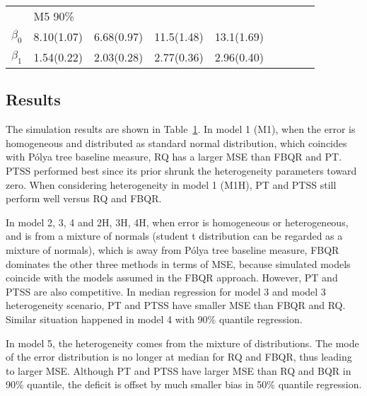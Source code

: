 \documentclass[12pt]{article}
\newcommand{\polya}{P\'{o}lya}
\begin{document}
\begin{center}
\begin{table}[h]
\begin{tabular}[tb]{c|llll|llll}
                & M5 90\%    &            &            &            &            &            &            &            \\
      $\beta_0$ & 8.10(1.07) & 6.68(0.97) & 11.5(1.48) & 13.1(1.69) &            &            &            &            \\
      $\beta_1$ & 1.54(0.22) & 2.03(0.28) & 2.77(0.36) & 2.96(0.40) &            &            &            &            \\
\hline
    \end{tabular}
    \label{ch2:tab:m1}
  \end{table}
\end{center}

\subsection{Results}
The simulation results are shown in Table~\ref{ch2:tab:m1}.  In model 1
(M1), when the error is homogeneous and distributed as standard normal
distribution, which coincides with \polya{} tree baseline measure, RQ
has a larger MSE than FBQR and PT. PTSS performed best since its prior
shrunk the heterogeneity parameters toward zero.  When considering
heterogeneity in model 1 (M1H), PT and PTSS still perform well versus
RQ and FBQR.

In model 2, 3, 4 and 2H, 3H, 4H, when error is homogeneous or
heterogeneous, and is from a mixture of normals (student t
distribution can be regarded as a mixture of normals), which is away
from \polya{} tree baseline measure, FBQR dominates the other three
methods in terms of MSE, because simulated models coincide with the
models assumed in the FBQR approach. However, PT and PTSS are also
competitive.  In median regression for model 3 and model 3
heterogeneity scenario, PT and PTSS have smaller MSE than FBQR and RQ.
Similar situation happened in model 4 with 90\% quantile
regression.

In model 5, the heterogeneity comes from the mixture of distributions.
The mode of the error distribution is no longer at median for RQ and
FBQR, thus leading to larger MSE. Although PT and PTSS have larger MSE
than RQ and BQR in 90\% quantile, the deficit is offset by much
smaller bias in 50\% quantile regression.
\end{document}
